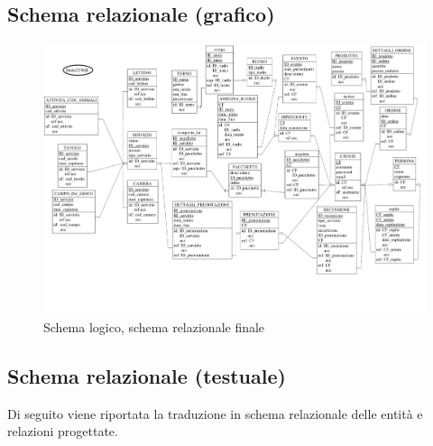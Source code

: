 \documentclass[a4paper,12pt]{report}
\begin{document}
\subsection{Schema relazionale (grafico)}
\begin{figure}[H]
	\centering
	\includegraphics[width=\textwidth, trim=0 75pt 0 0 , clip]{./pdf/finale logico.pdf}
	\caption{Schema logico, schema relazionale finale}
	\label{fig:schema-logico}
\end{figure}

\subsection{Schema relazionale (testuale)}
Di seguito viene riportata la traduzione in schema relazionale delle entità e relazioni progettate.
\end{document}
